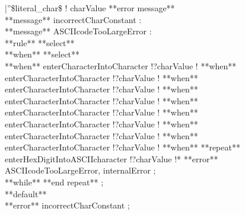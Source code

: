 {|''\$literal\_char\$ ! charValue **error message** %
\\ 
**message** incorrectCharConstant : %
\\ 
**message** ASCIIcodeTooLargeError : %
\\ 
**rule** %
 **select**\\ 
 **when** %
  **select**\\ 
  **when** %
   enterCharacterIntoCharacter !?charValue !%
  **when** %
   enterCharacterIntoCharacter !?charValue !%
  **when** %
   enterCharacterIntoCharacter !?charValue !%
  **when** %
   enterCharacterIntoCharacter !?charValue !%
  **when** %
   enterCharacterIntoCharacter !?charValue !%
  **when** %
   enterCharacterIntoCharacter !?charValue !%
  **when** %
   enterCharacterIntoCharacter !?charValue !%
  **when** %
   enterCharacterIntoCharacter !?charValue !%
  **when** %
   **repeat**\\ 
    enterHexDigitIntoASCIIcharacter !?charValue !* **error** ASCIIcodeTooLargeError, internalError ;\\ 
   **while** %
   **end repeat** ;\\ 
  **default**\\ 
   **error** incorrectCharConstant ;\\ 
}
